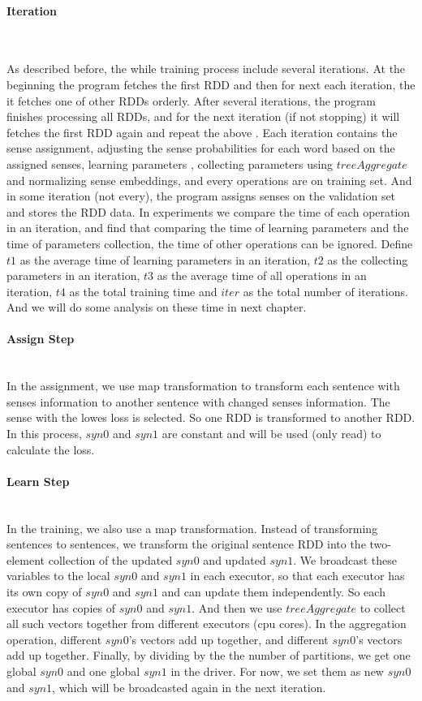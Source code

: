 \paragraph{Iteration}\ 

As described before, the while training process include several iterations. At the beginning the program fetches the first RDD and then for next each iteration, the it fetches one of other RDDs orderly. After several iterations, the program finishes processing all RDDs, and for the next iteration (if not stopping) it will fetches the first RDD again and repeat the above . Each iteration contains the sense assignment, adjusting the sense probabilities for each word based on the assigned senses, learning parameters , collecting parameters using $treeAggregate$ and normalizing sense embeddings, and every operations are on training set. And in some iteration (not every), the program assigns senses on the validation set and stores the RDD data. In experiments we compare the time of each operation in an iteration, and find that comparing the time of learning parameters and the time of parameters collection, the time of other operations can be ignored. Define $t1$ as the average time of learning parameters in an iteration, $t2$ as the collecting parameters in an iteration, $t3$ as the average time of all operations in an iteration, $t4$ as the total training time and $iter$ as the total number of iterations. And we will do some analysis on these time in next chapter.

\paragraph{Assign Step}\ \\
In the assignment, we use map transformation to transform each sentence with senses information to another sentence with changed senses information. The sense with the lowes loss is selected. So one RDD is transformed to another RDD. In this process, $syn0$ and $syn1$ are constant and will be used (only read) to calculate the loss. 


\paragraph{Learn Step}\ \\
In the training, we also use a map transformation. Instead of transforming sentences to sentences, we transform the original sentence RDD into the two-element collection of the updated $syn0$ and updated $syn1$. We broadcast these variables to the local $syn0$ and $syn1$ in each executor, so that each executor has its own  copy of $syn0$ and $syn1$ and can update them independently. So each executor has copies of $syn0$ and $syn1$. And then we use $treeAggregate$ to collect all such vectors together from different executors (cpu cores).  In the aggregation operation, different $syn0$'s vectors add up together, and different $syn0$'s vectors add up together. Finally, by dividing by the the number of partitions, we get one global $syn0$ and one global $syn1$ in the driver. For now, we set them as new $syn0$ and $syn1$, which will be broadcasted again in the next iteration. 

